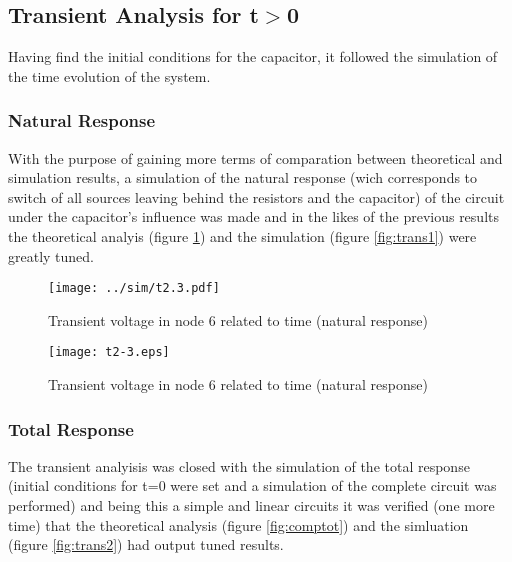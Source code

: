 

\subsection{Transient Analysis for t$>$0}

Having find the initial conditions for the capacitor, it followed the simulation of the time evolution of the system.

\subsubsection{Natural Response}

With the purpose of gaining more terms of comparation between theoretical and simulation results, a simulation of the natural response (wich corresponds to switch of all sources leaving behind the resistors and the capacitor) of the circuit under the capacitor's influence was made and in the likes of the previous results the theoretical analyis (figure \ref{fig:compnat}) and the simulation (figure \ref{fig:trans1}) were greatly tuned.

\begin{figure}[h] \centering
  \begin{minipage}{.5\textwidth}
    \texttt{[image: ../sim/t2.3.pdf]}
    \caption{Transient voltage in node 6 related to time (natural response)}
    \label{fig:trans1}
    \end{minipage}%
  \begin{minipage}{.5\textwidth}
    \vspace{10mm}
  \centering
    \texttt{[image: t2-3.eps]}
    \caption{Transient voltage in node 6 related to time (natural response)}
    \label{fig:compnat}
      \end{minipage}%
\end{figure}
  
\subsubsection{Total Response}

The transient analyisis was closed with the simulation of the total response (initial conditions for t=0 were set and a simulation of the complete circuit was performed) and being this a simple and linear circuits it was verified (one more time) that the theoretical analysis (figure \ref{fig:comptot}) and the simluation (figure \ref{fig:trans2}) had output tuned results.


